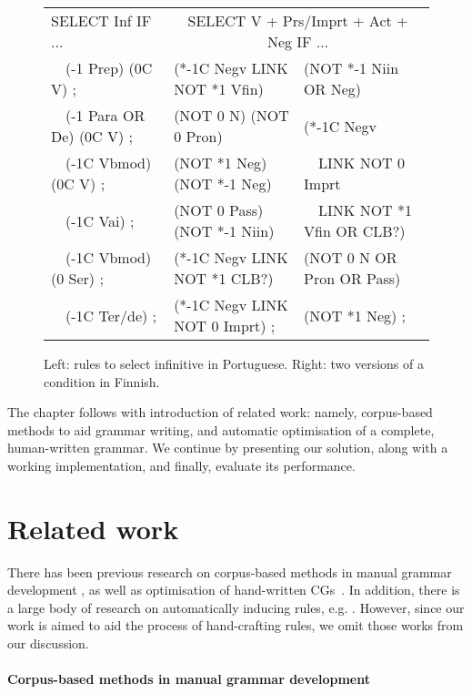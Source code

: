 

\begin{figure}[t]
\ttfamily
\centering
\begin{tabular}{l | @{~~~} l  l}
SELECT Inf IF ... & \multicolumn{2}{c}{SELECT V + Prs/Imprt + Act + Neg IF ...} \\
~~(-1 Prep) (0C V) ;       & (*-1C Negv LINK NOT *1 Vfin)  & (NOT *-1 Niin OR Neg)  \\
~~(-1 Para OR De) (0C V) ; & (NOT 0 N) (NOT 0 Pron)        & (*-1C Negv \\
~~(-1C Vbmod) (0C V) ;     & (NOT *1 Neg) (NOT *-1 Neg)    &  ~~LINK NOT 0 Imprt \\
~~(-1C Vai) ;              & (NOT 0 Pass) (NOT *-1 Niin)   &  ~~LINK NOT *1 Vfin OR CLB?) \\
~~(-1C Vbmod) (0 Ser) ;    & (*-1C Negv LINK NOT *1 CLB?)  & (NOT 0 N OR Pron OR Pass) \\
~~(-1C Ter/de) ;           & (*-1C Negv LINK NOT 0 Imprt) ;  & (NOT *1 Neg) ; \\

\end{tabular}

\caption{Left: rules to select infinitive in Portuguese. 
        Right: two versions of a condition in Finnish.}

\label{fig:infrules}
\end{figure}

The chapter follows with introduction of related work: namely, corpus-based methods to aid grammar writing, and automatic optimisation of a complete, human-written grammar. We continue by presenting our solution, along with a working implementation, and finally, evaluate its performance.

\section{Related work}
\label{sec:CGanaRelated}

There has been previous research on corpus-based methods in manual grammar development \cite{voutilainen2004}, as well as optimisation of hand-written CGs~\cite{bick2013tuning}.
In addition, there is a large body of research on automatically
inducing rules, e.g. \cite{inducing_cg1996,lindberg_eineborg98ilp,lager01transformation,asfrent14}.
However, since our work is aimed to aid the process of hand-crafting rules, we omit those works from our discussion.


\paragraph{Corpus-based methods in manual grammar development}

